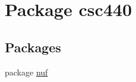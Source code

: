 \hypertarget{namespacecsc440}{\section{Package csc440}
\label{namespacecsc440}
}
\subsection*{Packages}
\begin{DoxyCompactItemize}
\item 
package \hyperlink{namespacecsc440_1_1nuf}{nuf}
\end{DoxyCompactItemize}
